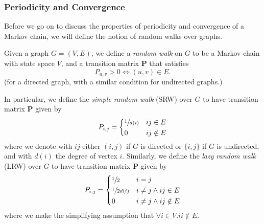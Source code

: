 		\subsubsection{Periodicity and Convergence}
			Before we go on to discuss the properties of periodicity and convergence 
			of a Markov chain, we will define the notion of random walks over graphs.
			\begin{definition}
				Given a graph $G=(V,E)$, we define a \emph{random walk} on $G$ to 
				be a Markov chain with state space $V$, and a transition matrix 
				$\mathbf{P}$ that satisfies 
				$$
					P_{u,v} > 0  \iff (u,v) \in E.
				$$
				(for a directed graph, with a similar condition for undirected 
				graphs.)
			\end{definition}
			In particular, we define the \emph{simple random walk} (SRW) over $G$ to have 
			transition matrix $\mathbf{P}$ given by 
			$$
				P_{i,j} = 
				\begin{dcases}
					\sfrac{1}{d(i)} & ij \in E \\
					0 & ij \notin E
				\end{dcases}
			$$
			where we denote with $ij$ either $(i,j)$ if $G$ is directed or $\{i,j\}$ if 
			$G$ is undirected, and with $d(i)$ the degree of vertex $i$. Similarly, we define the 
			\emph{lazy random walk} (LRW) over $G$ to have transition matrix $\mathbf{P}$ given
			by 	
			$$
				P_{i,j} = 
				\begin{dcases}
					\sfrac{1}{2} & i = j \\
					\sfrac{1}{2d(i)} & i \neq j \land ij \in E \\
					0 & i \neq j \land ij \notin E
				\end{dcases}
			$$
			where we make the simplifying assumption that $\forall i \in V . ii \notin E$.

